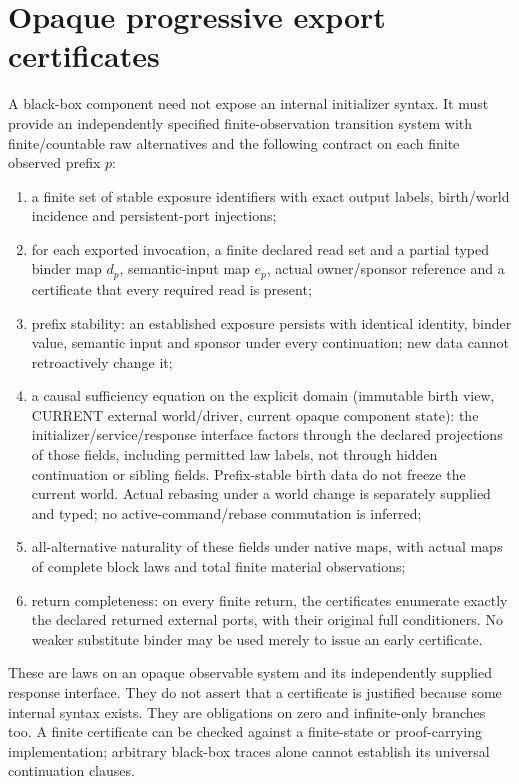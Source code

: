 \documentclass{article}
\begin{document}
\section{Opaque progressive export certificates}
A black-box component need not expose an internal initializer syntax. It must provide an independently specified finite-observation transition system with finite/countable raw alternatives and the following contract on each finite observed prefix $p$:
\begin{enumerate}
\item a finite set of stable exposure identifiers with exact output labels, birth/world incidence and persistent-port injections;
\item for each exported invocation, a finite declared read set and a partial typed binder map $d_p$, semantic-input map $e_p$, actual owner/sponsor reference and a certificate that every required read is present;
\item prefix stability: an established exposure persists with identical identity, binder value, semantic input and sponsor under every continuation; new data cannot retroactively change it;
\item a causal sufficiency equation on the explicit domain (immutable birth view, CURRENT external world/driver, current opaque component state): the initializer/service/response interface factors through the declared projections of those fields, including permitted law labels, not through hidden continuation or sibling fields. Prefix-stable birth data do not freeze the current world. Actual rebasing under a world change is separately supplied and typed; no active-command/rebase commutation is inferred;
\item all-alternative naturality of these fields under native maps, with actual maps of complete block laws and total finite material observations;
\item return completeness: on every finite return, the certificates enumerate exactly the declared returned external ports, with their original full conditioners. No weaker substitute binder may be used merely to issue an early certificate.
\end{enumerate}
These are laws on an opaque observable system and its independently supplied response interface. They do not assert that a certificate is justified because some internal syntax exists. They are obligations on zero and infinite-only branches too. A finite certificate can be checked against a finite-state or proof-carrying implementation; arbitrary black-box traces alone cannot establish its universal continuation clauses.
\end{document}

